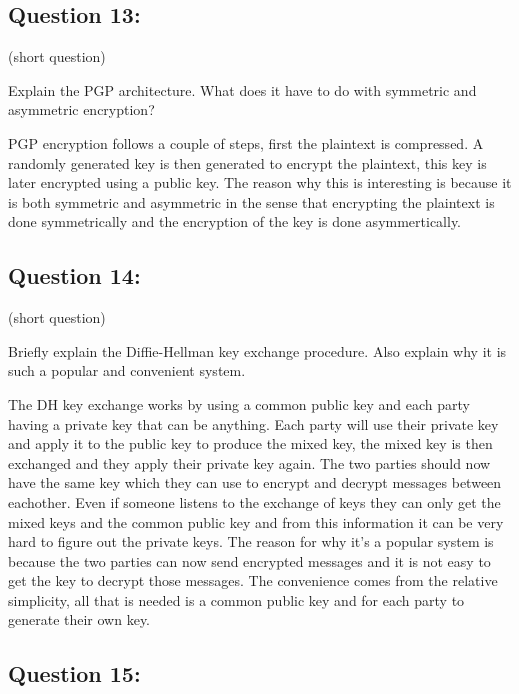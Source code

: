 \documentclass[11pt]{article}
\begin{document}
    \hypertarget{question-13}{%
\subsection{Question 13:}\label{question-13}}

(short question)

Explain the PGP architecture. What does it have to do with symmetric and
asymmetric encryption?

    PGP encryption follows a couple of steps, first the plaintext is
compressed. A randomly generated key is then generated to encrypt the
plaintext, this key is later encrypted using a public key. The reason
why this is interesting is because it is both symmetric and asymmetric
in the sense that encrypting the plaintext is done symmetrically and the
encryption of the key is done asymmertically.

    \hypertarget{question-14}{%
\subsection{Question 14:}\label{question-14}}

(short question)

Briefly explain the Diffie-Hellman key exchange procedure. Also explain
why it is such a popular and convenient system.

    The DH key exchange works by using a common public key and each party
having a private key that can be anything. Each party will use their
private key and apply it to the public key to produce the mixed key, the
mixed key is then exchanged and they apply their private key again. The
two parties should now have the same key which they can use to encrypt
and decrypt messages between eachother. Even if someone listens to the
exchange of keys they can only get the mixed keys and the common public
key and from this information it can be very hard to figure out the
private keys. The reason for why it's a popular system is because the
two parties can now send encrypted messages and it is not easy to get
the key to decrypt those messages. The convenience comes from the
relative simplicity, all that is needed is a common public key and for
each party to generate their own key.

    \hypertarget{question-15}{%
\subsection{Question 15:}\label{question-15}}
\end{document}
